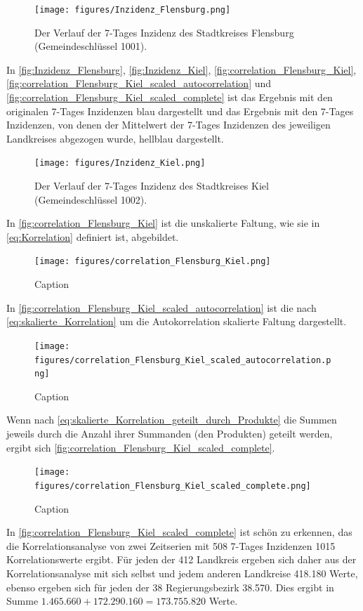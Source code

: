 \begin{figure}[H]
    \centering
    \texttt{[image: figures/Inzidenz\_Flensburg.png]}
    \caption{Der Verlauf der 7-Tages Inzidenz des Stadtkreises Flensburg (Gemeindeschlüssel 1001).}
    \label{fig:Inzidenz_Flensburg}
\end{figure}
In \autoref{fig:Inzidenz_Flensburg}, \autoref{fig:Inzidenz_Kiel}, \autoref{fig:correlation_Flensburg_Kiel}, \autoref{fig:correlation_Flensburg_Kiel_scaled_autocorrelation} und \autoref{fig:correlation_Flensburg_Kiel_scaled_complete} ist das Ergebnis mit den originalen 7-Tages Inzidenzen blau dargestellt und das Ergebnis mit den 7-Tages Inzidenzen, von denen der Mittelwert der 7-Tages Inzidenzen des jeweiligen Landkreises abgezogen wurde, hellblau dargestellt.
\begin{figure}[H]
    \centering
    \texttt{[image: figures/Inzidenz\_Kiel.png]}
    \caption{Der Verlauf der 7-Tages Inzidenz des Stadtkreises Kiel (Gemeindeschlüssel 1002).}
    \label{fig:Inzidenz_Kiel}
\end{figure}
In \autoref{fig:correlation_Flensburg_Kiel} ist die unskalierte Faltung, wie sie in \autoref{eq:Korrelation} definiert ist, abgebildet.
\begin{figure}[H]
    \centering
    \texttt{[image: figures/correlation\_Flensburg\_Kiel.png]}
    \caption{Caption}
    \label{fig:correlation_Flensburg_Kiel}
\end{figure}
In \autoref{fig:correlation_Flensburg_Kiel_scaled_autocorrelation} ist die nach \autoref{eq:skalierte_Korrelation} um die Autokorrelation skalierte Faltung dargestellt.
\begin{figure}[H]
    \centering
    \texttt{[image: figures/correlation\_Flensburg\_Kiel\_scaled\_autocorrelation.png]}
    \caption{Caption}
    \label{fig:correlation_Flensburg_Kiel_scaled_autocorrelation}
\end{figure}
Wenn nach \autoref{eq:skalierte_Korrelation_geteilt_durch_Produkte} die  Summen jeweils durch die Anzahl ihrer Summanden (den Produkten) geteilt werden, ergibt sich \autoref{fig:correlation_Flensburg_Kiel_scaled_complete}.
\begin{figure}[H]
    \centering
    \texttt{[image: figures/correlation\_Flensburg\_Kiel\_scaled\_complete.png]}
    \caption{Caption}
    \label{fig:correlation_Flensburg_Kiel_scaled_complete}
\end{figure}

In \autoref{fig:correlation_Flensburg_Kiel_scaled_complete} ist schön zu erkennen, das die Korrelationsanalyse von zwei Zeitserien mit 508 7-Tages Inzidenzen 1015 Korrelationswerte ergibt.
Für jeden der 412 Landkreis ergeben sich daher aus der Korrelationsanalyse mit sich selbst und jedem anderen Landkreise 418.180 Werte, ebenso ergeben sich für jeden der 38 Regierungsbezirk 38.570. Dies ergibt in Summe $
1.465.660+172.290.160=173.755.820$ Werte.

